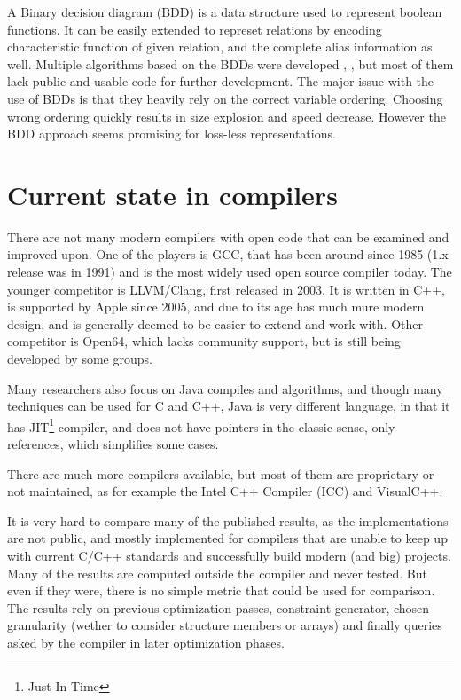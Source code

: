 A Binary decision diagram (BDD) is a data structure used to represent boolean
functions. It can be easily extended to represet relations by encoding
characteristic function of given relation, and the complete alias information as
well. Multiple algorithms based on the BDDs were developed \cite{whaley2004},
\cite{bddbddb}, but most of them lack public and usable code for further
development. The major issue with the use of BDDs is that they heavily rely on
the correct variable ordering. Choosing wrong ordering quickly results in
size explosion and speed decrease. However the BDD approach seems promising for
loss-less representations.

\section{Current state in compilers}

There are not many modern compilers with open code that can be examined and improved
upon. One of the players is GCC, that has been around since 1985
(1.x release was in 1991) and is the most widely used open source compiler
today. The younger competitor is LLVM/Clang, first released in 2003. It is
written in C++, is supported by Apple since 2005, and due to its age has much
mure modern design, and is generally deemed to be easier to extend and work
with. Other competitor is Open64, which lacks community support, but is still
being developed by some groups.

Many researchers also focus on Java compiles and algorithms, and though many
techniques can be used for C and C++, Java is very different language, in that
it has JIT\footnote{Just In Time} compiler, and does not have pointers in the
classic sense, only references, which simplifies some cases.

There are much more compilers available, but most of them are proprietary or not
maintained, as for example the Intel C++ Compiler (ICC) and VisualC++.

It is very hard to compare many of the published results, as the
implementations are not public, and mostly implemented for compilers that are
unable to keep up with current C/C++ standards and successfully build modern
(and big) projects. Many of the results are computed outside the compiler and
never tested. But even if they were, there is no simple metric that could be
used for comparison. The results rely on previous optimization passes,
constraint generator, chosen granularity (wether to consider structure members or
arrays) and finally queries asked by the compiler in later optimization phases.

